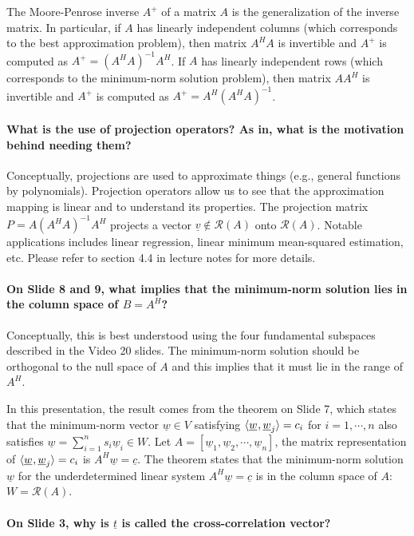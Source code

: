\documentclass[10pt,english]{article}
\begin{document}
The Moore-Penrose inverse $A^+$ of a matrix $A$ is the generalization of the inverse matrix. In particular, if $A$ has linearly independent columns (which corresponds to the best approximation problem), then matrix $A^HA$ is invertible and $A^+$ is computed as $A^+=(A^HA)^{-1}A^H$.
If $A$ has linearly independent rows (which corresponds to the minimum-norm solution problem), then matrix $AA^H$ is invertible and $A^+$ is computed as $A^+=A^H(A^HA)^{-1}$.

\paragraph{What is the use of projection operators? As in, what is the motivation behind needing them?}
Conceptually, projections are used to approximate things (e.g., general functions by polynomials).
Projection operators allow us to see that the approximation mapping is linear and to understand its properties.
The projection matrix $P=A(A^HA)^{-1}A^H$ projects a vector $\underline{v} \notin \mathcal{R}(A)$ onto $\mathcal{R}(A)$. Notable applications includes linear regression, linear minimum mean-squared estimation, etc. Please refer to section 4.4 in lecture notes for more details.

\paragraph{On Slide 8 and 9, what implies that the minimum-norm solution lies in the column space of $B=A^H$?}
Conceptually, this is best understood using the four fundamental subspaces described in the Video 20 slides.
The minimum-norm solution should be orthogonal to the null space of $A$ and this implies that it must lie in the range of $A^H$. 

In this presentation, the result comes from the theorem on Slide 7, which states that the minimum-norm vector $\underline{w} \in V$ satisfying ${\langle  \underline{w} \mskip1mu , \underline{w}_j  \rangle}=c_i$ for $i=1, \cdots, n$ also satisfies $\underline{w}=\sum_{i=1}^n s_i\underline{w}_i \in W$. Let $A=[\underline{w}_1, \underline{w}_2, \cdots, \underline{w}_n]$, the matrix representation of ${\langle  \underline{w} \mskip1mu , \underline{w}_j  \rangle}=c_i$ is $A^H\underline{w}=\underline{c}$. The theorem states that the minimum-norm solution $\underline{w}$ for the underdetermined linear system $A^H\underline{w}=\underline{c}$ is in the column space of $A$: $W=\mathcal{R}(A)$.

\paragraph{On Slide 3, why is $\underline{t}$ is called the cross-correlation vector?}
\end{document}
